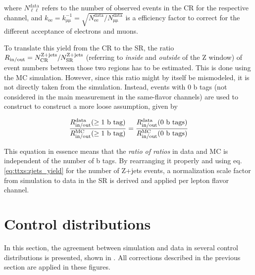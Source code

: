 where $N_{\mathrm{\ell \ell}}^{\mathrm{data}}$ refers to the number of observed events in the CR for the respective channel, and $k_{\mathrm{ee}} = k_{\mathrm{\mu\mu}}^{-1} = \sqrt{N_{\mathrm{ee}}^{\mathrm{data}} / N_{\mathrm{\mu\mu}}^{\mathrm{data}}}$ is a efficiency factor to correct for the different acceptance of electrons and muons.

To translate this yield from the CR to the SR, the ratio $R_{\mathrm{in/out}} = N_{\mathrm{CR}}^{\mathrm{Z+jets}} / N_{\mathrm{SR}}^{\mathrm{Z+jets}}$ (referring to \textit{inside} and \textit{outside} of the Z window) of event numbers between those two regions has to be estimated. This is done using the MC simulation. However, since this ratio might by itself be mismodeled, it is not directly taken from the simulation. Instead, events with 0 b tags (not considered in the main measurement in the same-flavor channels) are used to construct to construct a more loose assumption, given by

\begin{equation}
    \frac{  R_{\mathrm{in/out}}^{\text{data}} ( \geq \text{1 b tag} ) } { R_{\mathrm{in/out}}^{\text{MC}} ( \geq \text{1 b tag} ) } = \frac{  R_{\mathrm{in/out}}^{\text{data}} ( \text{0 b tags} ) } { R_{\mathrm{in/out}}^{\text{MC}} ( \text{0 b tags} ) }
\end{equation}

This equation in essence means that the \textit{ratio of ratios} in data and MC is independent of the number of b tags. By rearranging it properly and using eq. \ref{eq:ttxs:zjets_yield} for the number of Z+jets events, a normalization scale factor from simulation to data in the SR is derived and applied per lepton flavor channel.

\section{Control distributions}
\label{sec:ttxs:control}

In this section, the agreement between simulation and data in several control distributions is presented, shown in . All corrections described in the previous section are applied in these figures.

